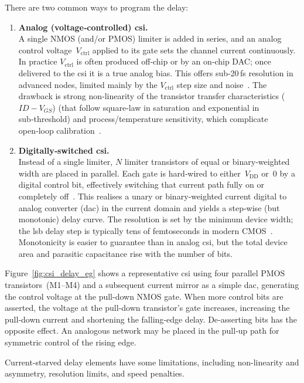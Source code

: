 There are two common ways to program the delay:
\begin{enumerate}[label=\alph*]
  \item \textbf{Analog (voltage‑controlled) \gls{csi}.}\\
        A single NMOS (and/or PMOS) limiter is added in series, and an analog control voltage~$V_{\mathrm{ctrl}}$ applied to its gate sets the channel current continuously.  In practice $V_{\mathrm{ctrl}}$ is often produced off‑chip or by an on‑chip DAC; once delivered to the \gls{csi} it is a true analog bias.  This offers sub‑20\,fs resolution in advanced nodes, limited mainly by the $V_{\mathrm{ctrl}}$ step size and noise~\cite{Batur2015high}.  The drawback is strong non‑linearity of the transistor transfer characteristics (\(ID-V_{GS}\)) (that follow square‑law in saturation and exponential in sub‑threshold) and process/temperature sensitivity, which complicate open‑loop calibration~\cite{Seraj2015new}.
  \item \textbf{Digitally‑switched \gls{csi}.}\\
        Instead of a single limiter, $N$ limiter transistors of equal or binary‑weighted width are placed in parallel.  Each gate is hard‑wired to either~$V_{\mathrm{DD}}$ or~0 by a digital control bit, effectively switching that current path fully on or completely off~\cite{maymandi2005monotonic,yao2011}.  This realises a unary or binary‑weighted current digital to analog converter (\gls{dac}) in the current domain and yields a step‑wise (but monotonic) delay curve.  The resolution is set by the minimum device width; the \gls{lsb} delay step is typically tens of femtoseconds in modern CMOS~\cite{Heck2015optimization}.  Monotonicity is easier to guarantee than in analog \gls{csi}, but the total device area and parasitic capacitance rise with the number of bits.
\end{enumerate}

Figure~\ref{fig:csi_delay_eg} shows a representative \gls{csi} using four parallel PMOS transistors~(M1--M4) and a subsequent current mirror as a simple \gls{dac}, generating the control voltage at the pull-down NMOS gate. When more control bits are asserted, the voltage at the pull-down transistor's gate increases, increasing the pull‑down current and shortening the falling‑edge delay. De‑asserting bits has the opposite effect. An analogous network may be placed in the pull‑up path for symmetric control of the rising edge.

Current-starved delay elements have some limitations, including non-linearity and asymmetry, resolution limits, and speed penalties.

